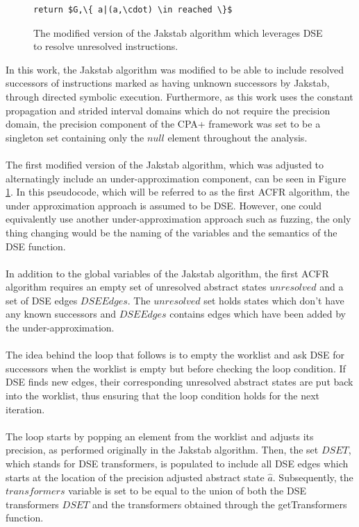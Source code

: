 \documentclass{kththesis}
\begin{document}
\begin{figure}[htb]
\begin{algorithmFrame}
\begin{lstlisting}[style=algorithm]
return $G,\{ a|(a,\cdot) \in reached \}$
\end{lstlisting}
\end{algorithmFrame}
\caption[The modified version of the Jakstab algorithm which leverages DSE to resolve unresolved instructions.]{The modified version of the Jakstab algorithm which leverages DSE to resolve unresolved instructions.}
    \label{fig:ACFR1}
\end{figure}
\clearpage
\noindent
In this work, the Jakstab algorithm was modified to be able to include resolved successors of instructions marked as having unknown successors by Jakstab, through directed symbolic execution. Furthermore, as this work uses the constant propagation and strided interval domains which do not require the precision domain, the precision component of the CPA+ framework was set to be a singleton set containing only the $null$ element throughout the analysis.
\\ \\
The first modified version of the Jakstab algorithm, which was adjusted to alternatingly include an under-approximation component, can be seen in Figure \ref{fig:ACFR1}. In this pseudocode, which will be referred to as the first ACFR algorithm, the under approximation approach is assumed to be DSE. However, one could equivalently use another under-approximation approach such as fuzzing, the only thing changing would be the naming of the variables and the semantics of the DSE function.
\\ \\
In addition to the global variables of the Jakstab algorithm, the first ACFR algorithm requires an empty set of unresolved abstract states $unresolved$ and a set of DSE edges $DSEEdges$. The $unresolved$ set holds states which don't have any known successors and $DSEEdges$ contains edges which have been added by the under-approximation. 
\\ \\
The idea behind the loop that follows is to empty the worklist and ask DSE for successors when the worklist is empty but before checking the loop condition. If DSE finds new edges, their corresponding unresolved abstract states are put back into the worklist, thus ensuring that the loop condition holds for the next iteration.
\\ \\
The loop starts by popping an element from the worklist and adjusts its precision, as performed originally in the Jakstab algorithm. Then, the set $DSET$, which stands for DSE transformers, is populated to include all DSE edges which starts at the location of the precision adjusted abstract state $\hat{a}$. Subsequently, the $transformers$ variable is set to be equal to the union of both the DSE transformers $DSET$ and the transformers obtained through the getTransformers function.
\end{document}
